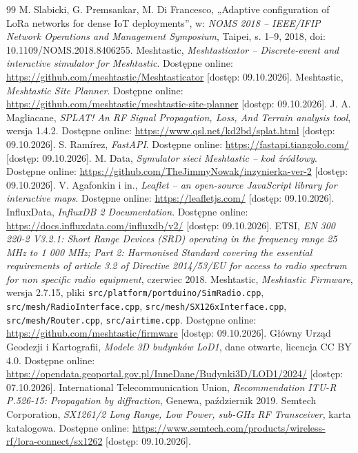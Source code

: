 \documentclass[12pt,a4paper,twoside]{report}
\theoremstyle{definition} %
\begin{document}
\begin{thebibliography}{99}
     M. Slabicki, G. Premsankar, M. Di Francesco, „Adaptive configuration of LoRa networks for dense IoT deployments”, w: \emph{NOMS 2018 -- IEEE/IFIP Network Operations and Management Symposium}, Taipei, s. 1--9, 2018, doi: 10.1109/NOMS.2018.8406255.
     Meshtastic, \emph{Meshtasticator -- Discrete-event and interactive simulator for Meshtastic}. Dostępne online: \url{https://github.com/meshtastic/Meshtasticator} [dostęp: 09.10.2026].
     Meshtastic, \emph{Meshtastic Site Planner}. Dostępne online: \url{https://github.com/meshtastic/meshtastic-site-planner} [dostęp: 09.10.2026].
     J. A. Magliacane, \emph{SPLAT! An RF Signal Propagation, Loss, And Terrain analysis tool}, wersja 1.4.2. Dostępne online: \url{https://www.qsl.net/kd2bd/splat.html} [dostęp: 09.10.2026].
     S. Ramírez, \emph{FastAPI}. Dostępne online: \url{https://fastapi.tiangolo.com/} [dostęp: 09.10.2026].
     M. Data, \emph{Symulator sieci Meshtastic -- kod źródłowy}. Dostępne online: \url{https://github.com/TheJimmyNowak/inzynierka-ver-2} [dostęp: 09.10.2026].
     V. Agafonkin i in., \emph{Leaflet -- an open-source JavaScript library for interactive maps}. Dostępne online: \url{https://leafletjs.com/} [dostęp: 09.10.2026].
     InfluxData, \emph{InfluxDB 2 Documentation}. Dostępne online: \url{https://docs.influxdata.com/influxdb/v2/} [dostęp: 09.10.2026].
     ETSI, \emph{EN 300 220-2 V3.2.1: Short Range Devices (SRD) operating in the frequency range 25 MHz to 1 000 MHz; Part 2: Harmonised Standard covering the essential requirements of article 3.2 of Directive 2014/53/EU for access to radio spectrum for non specific radio equipment}, czerwiec 2018.
     Meshtastic, \emph{Meshtastic Firmware}, wersja 2.7.15, pliki \texttt{src/platform/portduino/SimRadio.cpp}, \texttt{src/mesh/RadioInterface.cpp}, \texttt{src/mesh/SX126xInterface.cpp}, \texttt{src/mesh/Router.cpp}, \texttt{src/airtime.cpp}. Dostępne online: \url{https://github.com/meshtastic/firmware} [dostęp: 09.10.2026].
     Główny Urząd Geodezji i Kartografii, \emph{Modele 3D budynków LoD1}, dane otwarte, licencja CC BY 4.0. Dostępne online: \url{https://opendata.geoportal.gov.pl/InneDane/Budynki3D/LOD1/2024/} [dostęp: 07.10.2026].
     International Telecommunication Union, \emph{Recommendation ITU-R P.526-15: Propagation by diffraction}, Genewa, październik 2019.
     Semtech Corporation, \emph{SX1261/2 Long Range, Low Power, sub-GHz RF Transceiver}, karta katalogowa. Dostępne online: \url{https://www.semtech.com/products/wireless-rf/lora-connect/sx1262} [dostęp: 09.10.2026].

\end{thebibliography}
\end{document}
